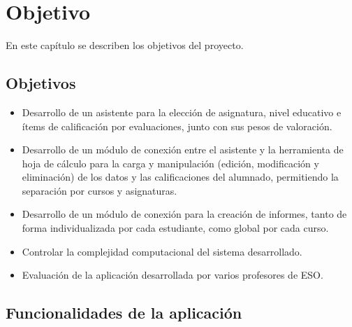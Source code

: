 \chapter{Objetivo}
\label{cap:objetivo}

En este capítulo se describen los objetivos del proyecto.

\section{Objetivos}
\begin{itemize}
	\item Desarrollo de un asistente para la elección de asignatura, nivel educativo e 		ítems de calificación por evaluaciones, junto con sus pesos de valoración. 
	\item Desarrollo de un módulo de conexión entre el asistente y la herramienta de hoja de cálculo para la carga y manipulación (edición, modificación y eliminación) de los datos y las calificaciones del alumnado, permitiendo la separación por cursos y asignaturas.
	\item Desarrollo de un módulo de conexión para la creación de informes, tanto de forma individualizada por cada estudiante, como global por cada curso.
	\item Controlar la complejidad computacional del sistema desarrollado.
	\item Evaluación de la aplicación desarrollada por varios profesores de ESO.
\end{itemize}	


\section{Funcionalidades de la aplicación} 
\label{funcionalidades}


